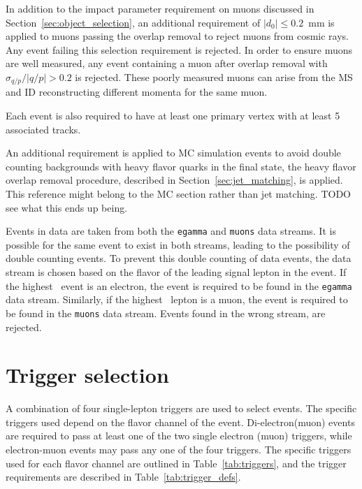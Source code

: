 In addition to the impact parameter requirement on muons discussed in
Section~\ref{sec:object_selection}, an additional requirement of
$|d_0| \leq 0.2$~mm is applied to muons passing the overlap removal to reject
muons from cosmic rays. Any event failing this selection requirement is
rejected.
In order to ensure muons are well measured, any event containing a muon after
overlap removal with $\sigma_{q/p}/|q/p| > 0.2$ is rejected.
These poorly measured muons can arise from the MS and ID reconstructing
different momenta for the same muon.

Each event is also required to have at least one primary vertex with at least
5 associated tracks.

An additional requirement is applied to MC simulation events to avoid double
counting backgrounds with heavy flavor quarks in the final state, the heavy
flavor overlap removal procedure, described in Section~\ref{sec:jet_matching},
is applied.
{\color{red} This reference might belong to the MC section rather than jet
matching. TODO see what this ends up being.}

Events in data are taken from both the \texttt{egamma} and \texttt{muons} data
streams.
It is possible for the same event to exist in both streams, leading to the
possibility of double counting events.
To prevent this double counting of data events, the data stream is chosen based
on the flavor of the leading signal lepton in the event.
If the highest \pt\ event is an electron, the event is required to be found in
the \texttt{egamma} data stream.
Similarly, if the highest \pt\ lepton is a muon, the event is required to be
found in the \texttt{muons} data stream.
Events found in the wrong stream, are rejected.

\FloatBarrier
\section{Trigger selection}
\label{sec:trigger_selection}

A combination of four single-lepton triggers are used to select events.
The specific triggers used depend on the flavor channel of the event.
Di-electron(muon) events are required to pass at least one of the two single
electron (muon) triggers, while electron-muon events may pass any one of the
four triggers.
The specific triggers used for each flavor channel are outlined in
Table~\ref{tab:triggers}, and the trigger requirements are described in
Table~\ref{tab:trigger_defs}.

